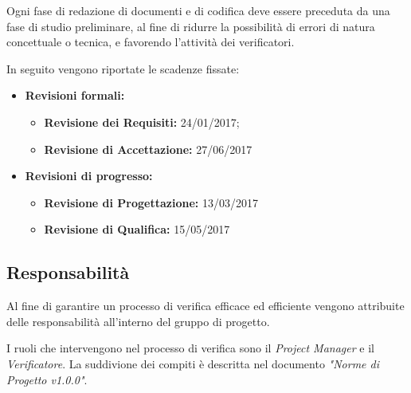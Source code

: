 \documentclass[12pt,a4paper,titlepage]{article}
\begin{document}
	Ogni fase di redazione di documenti e di codifica deve essere preceduta da una fase di studio preliminare, al fine di ridurre la possibilità di errori di natura concettuale o tecnica, e favorendo l'attività dei verificatori.
	
	In seguito vengono riportate le scadenze fissate:
	\begin{itemize}
		\item \textbf{Revisioni formali:}
			\begin{itemize}
				\item \textbf{Revisione dei Requisiti:} 24/01/2017;
				\item \textbf{Revisione di Accettazione:} 27/06/2017
			\end{itemize}
		\item \textbf{Revisioni di progresso:}
			\begin{itemize}
				\item \textbf{Revisione di Progettazione:} 13/03/2017
				\item \textbf{Revisione di Qualifica:} 15/05/2017
			\end{itemize}
	\end{itemize}
	\subsection{Responsabilità}
	Al fine di garantire un processo di verifica efficace ed efficiente vengono attribuite delle responsabilità all'interno del gruppo di progetto. 
	
	I ruoli che intervengono nel processo di verifica sono il \textit{Project Manager} e il \textit{Verificatore}. La suddivione dei compiti è descritta nel documento \textit{"Norme di Progetto v1.0.0"}.
\end{document}
